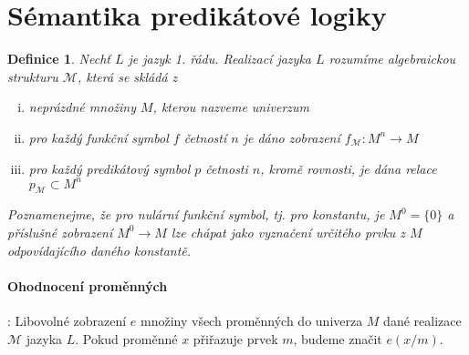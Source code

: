 \documentclass[a4paper, 11pt]{report}
\newtheorem{mydef}{Definice}[chapter]
\begin{document}
\section{Sémantika predikátové logiky}

\begin{mydef}
Nechť $L$ je jazyk 1. řádu. \emph{Realizací jazyka} $L$ rozumíme algebraickou strukturu $\mathcal{M}$, která se skládá z
\begin{enumerate}[(i)]
	\item neprázdné množiny $M$, kterou nazveme \emph{univerzum}
	\item pro každý funkční symbol $f$ četností $n$ je dáno zobrazení $f_\mathcal{M} : M^n \to M$
	\item pro každý predikátový symbol $p$ četnosti $n$, kromě rovnosti, je dána relace $p_\mathcal{M} \subset M^n$
\end{enumerate}
Poznamenejme, že pro nulární funkční symbol, tj. pro konstantu, je $M^0 = \{0\}$ a příslušné zobrazení $M^0 \to M$ lze chápat jako vyznačení určitého prvku z $M$ odpovídajícího daného konstantě.
\end{mydef}

\paragraph{Ohodnocení proměnných}: Libovolné zobrazení $e$ množiny všech proměnných do univerza $M$ dané realizace $\mathcal{M}$ jazyka $L$. Pokud proměnné $x$ přiřazuje prvek $m$, budeme značit $e(x/m)$.
\end{document}
